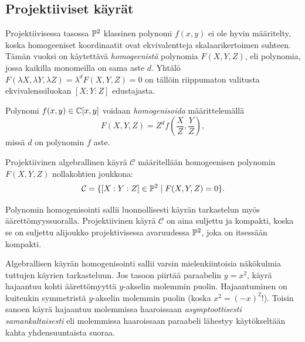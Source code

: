 \subsection{Projektiiviset käyrät}
Projektiivisessa tasossa $\P^2$ klassinen polynomi $f(x,y)$ ei ole hyvin määritelty, koska homogeeniset koordinaatit ovat ekvivalentteja skalaarikertoimen suhteen. Tämän vuoksi on käytettävä \emph{homogeenistä} polynomia $F(X,Y,Z)$, eli polynomia, jossa kaikilla monomeilla on sama aste $d$. Yhtälö $F(\lambda X, \lambda Y, \lambda Z) = \lambda^d F(X,Y,Z) = 0$ on tällöin riippumaton valitusta ekvivalenssiluokan $[X:Y:Z]$ edustajasta.
\begin{maaritelma}[Homogenisointi]
    Polynomi $f(x,y) \in \C[x,y]$ voidaan \emph{homogenisoida} määrittelemällä
    \begin{equation*}
        F(X,Y,Z) = Z^d f\left(\frac{X}{Z}, \frac{Y}{Z}\right),
    \end{equation*}
    missä $d$ on polynomin $f$ aste.
\end{maaritelma}
\begin{maaritelma}
    Projektiivinen algebrallinen käyrä $\mathcal{C}$ määritellään homogeenisen polynomin $F(X,Y,Z)$ nollakohtien joukkona:
    \begin{equation*}
        \mathcal{C} = \{ [X:Y:Z] \in \P^2 \mid F(X,Y,Z) = 0 \}.
    \end{equation*}
\end{maaritelma}
\begin{huomautus}
    Polynomin homogenisointi sallii luonnollisesti käyrän tarkastelun myös äärettömyyssuoralla. Projektiivinen käyrä $\mathcal{C}$ on aina suljettu ja kompakti, koska se on suljettu alijoukko projektivisessa avaruudessa $\P^2$, joka on itsessään kompakti.
\end{huomautus}
Algebrallisen käyrän homogenisointi sallii varsin mielenkiintoisia näkökulmia tuttujen käyrien tarkasteluun. Jos tasoon piirtää paraabelin $y=x^2$, käyrä hajaantuu kohti äärettömyyttä $y$-akselin molemmin puolin. Hajaantuminen on kuitenkin symmetristä $y$-akselin molemmin puolin (koska $x^2=(-x)^2$!). Toisin sanoen käyrä hajaantuu molemmissa haaroissaan \emph{asymptoottisesti samankaltaisesti} eli molemmissa haaroissaan paraabeli lähestyy käytökseltään kahta yhdensuuntaista suoraa.
